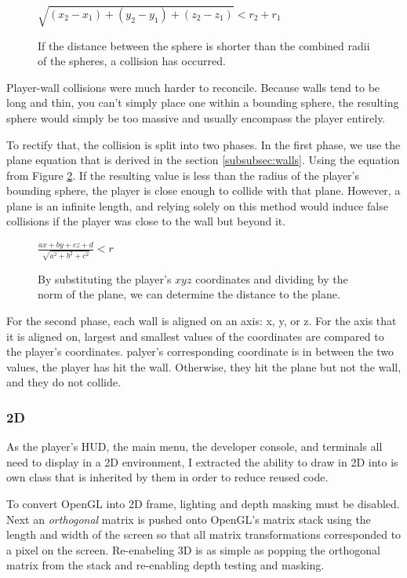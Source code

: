 \documentclass{article}
\begin{document}
\begin{figure}[H]
	$\sqrt{(x_2 - x_1) + (y_2 - y_1) + (z_2 - z_1)} < r_2 + r_1$
	\caption{If the distance between the sphere is shorter than the combined radii of the spheres, a collision has occurred.}
	\label{fig:collisionsphere}
\end{figure}

Player-wall collisions were much harder to reconcile. Because walls tend to be long and thin, you can't simply place one within a bounding sphere, the resulting sphere would simply be too massive and usually encompass the player entirely. 

To rectify that, the collision is split into two phases. In the first phase, we use the plane equation that is derived in the section \ref{subsubsec:walls}. Using the equation from Figure \ref{fig:wallcollision}. If the resulting value is less than the radius of the player's bounding sphere, the player is close enough to collide with that plane. However, a plane is an infinite length, and relying solely on this method would induce false collisions if the player was close to the wall but beyond it.

\begin{figure}[H]
	$\frac{ax + by + cz + d}{\sqrt{a^2 + b^2 + c^2}} < r$
	\caption{By substituting the player's $xyz$ coordinates and dividing by the norm of the plane, we can determine the distance to the plane.}
	\label{fig:wallcollision}
\end{figure}

For the second phase, each wall is aligned on an axis: x, y, or z. For the axis that it is aligned on, largest and smallest values of the coordinates are compared to the player's coordinates. palyer's corresponding coordinate is in between the two values, the player has hit the wall. Otherwise, they hit the plane but not the wall, and they do not collide.

\subsubsection{2D} \label{subsubsec:2D}

As the player's HUD, the main menu, the developer console, and terminals all need to display in a 2D environment, I extracted the ability to draw in 2D into is own class that is inherited by them in order to reduce reused code.

To convert OpenGL into 2D frame, lighting and depth masking must be disabled. Next an \emph{orthogonal} matrix is pushed onto OpenGL's matrix stack using the length and width of the screen so that all matrix transformations corresponded to a pixel on the screen. Re-enabeling 3D is as simple as popping the orthogonal matrix from the stack and re-enabling depth testing and masking.
\end{document}

